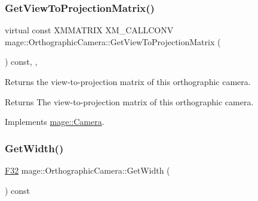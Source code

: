 \hypertarget{classmage_1_1_orthographic_camera_a9ba51750d26d91fa094d82f875c7f1e5}{}\label{classmage_1_1_orthographic_camera_a9ba51750d26d91fa094d82f875c7f1e5} 
\subsubsection{\texorpdfstring{Get\+View\+To\+Projection\+Matrix()}{GetViewToProjectionMatrix()}}
{\footnotesize\ttfamily virtual const X\+M\+M\+A\+T\+R\+IX X\+M\+\_\+\+C\+A\+L\+L\+C\+O\+NV mage\+::\+Orthographic\+Camera\+::\+Get\+View\+To\+Projection\+Matrix (\begin{DoxyParamCaption}{ }\end{DoxyParamCaption}) const\hspace{0.3cm}{\ttfamily [override]}, {\ttfamily [virtual]}, {\ttfamily [noexcept]}}

Returns the view-\/to-\/projection matrix of this orthographic camera.

\begin{DoxyReturn}{Returns}
The view-\/to-\/projection matrix of this orthographic camera. 
\end{DoxyReturn}


Implements \hyperlink{classmage_1_1_camera_a716d842481321b8b4d71da45ab77a7c9}{mage\+::\+Camera}.

\hypertarget{classmage_1_1_orthographic_camera_adbafcc6cf5175f10e75599b0bbe95740}{}\label{classmage_1_1_orthographic_camera_adbafcc6cf5175f10e75599b0bbe95740} 
\subsubsection{\texorpdfstring{Get\+Width()}{GetWidth()}}
{\footnotesize\ttfamily \hyperlink{namespacemage_aa97e833b45f06d60a0a9c4fc22ae02c0}{F32} mage\+::\+Orthographic\+Camera\+::\+Get\+Width (\begin{DoxyParamCaption}{ }\end{DoxyParamCaption}) const\hspace{0.3cm}{\ttfamily [noexcept]}}

